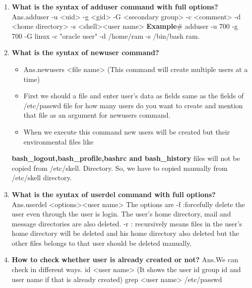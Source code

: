 \begin{enumerate}
    \bigskip
    \bigskip

    \item\textbf {What is the syntax of adduser  command with full options?}
     Ans.adduser  -u <uid>  -g <gid>  -G <secondary group> -c  <comment>  -d <home
    directory> -s <shell><user name>
    \newline
    \textbf{Example}\# adduser  -u  700  -g  700  -G  linux   -c  "oracle user"   -d  /home/ram   -s
    /bin/bash ram.

    \bigskip
    \bigskip
    
    \item\textbf{What is the syntax of newuser command?}
    \newline
    \begin{itemize}
        \item Ans.newusers   <file name>	(This command will create multiple users at a time)
        \item First we should a file and enter user's data as fields same as the fields of /etc/passwd file for how many users do you want to create and mention that file as an argument for newusers command.
        \item When we execute this command new users will be created but their environmental files like        
    \end{itemize}  
        \textbf{bash\_logout,bash\_profile,bashrc and bash\_history}  files will not be copied from /etc/skell.
         Directory. So, we have to  copied manually from  /etc/skell   directory.

     \bigskip
     \bigskip
     
     \item\textbf{What is the syntax of userdel command with full options?}
     \newline
      Ans.userdel     <options><user name>
          The options are
          -f :forcefully delete the user even through the user is login. The user's home directory, mail and message directories are also deleted. 
          -r : recursively means files in the user's home directory will be deleted and  his  home directory also deleted but the other files belongs to that user should be   deleted manually.

    \bigskip
    \bigskip

    \item\textbf{How to check whether user is already created or not?}
    \newline
     Ans.We can check in different ways.
         id   <user name>   (It shows the user id group id and user name if that is already created)
         grep <user name> /etc/passwd
    

\end{enumerate}
